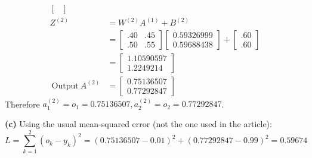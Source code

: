\documentclass[a4paper, 12pt]{article}
\begin{document}
\begin{solution}
\begin{align*}
\begin{bmatrix}
        \end{bmatrix} \\
        Z^{(2)} &= W^{(2)} A^{(1)} + B^{(2)} \\
        &= \begin{bmatrix}
        .40 & .45 \\
        .50 & .55
        \end{bmatrix} \begin{bmatrix}
            0.59326999 \\ 0.59688438
            \end{bmatrix}  + \begin{bmatrix}
            .60 \\.60
            \end{bmatrix} \\
            &= \begin{bmatrix}
                1.10590597 \\1.2249214
            \end{bmatrix} \\
            \:\text{Output}\: A^{(2)} &= \begin{bmatrix}
                0.75136507 \\
                0.77292847
            \end{bmatrix}
    \end{align*}
    Therefore $a^{(2)}_1 = o_1 = 0.75136507, a^{(2)}_2 = o_2 = 0.77292847 $.

    \textbf{(c)} Using the usual mean-squared error (not the one used in the article):
    \[
    L = \sum_{k=1}^{2} (o_k - y_k)^2 = (0.75136507 - 0.01)^2 + (0.77292847 - 0.99)^2 = 0.59674
    \]


\end{solution}
\end{document}
